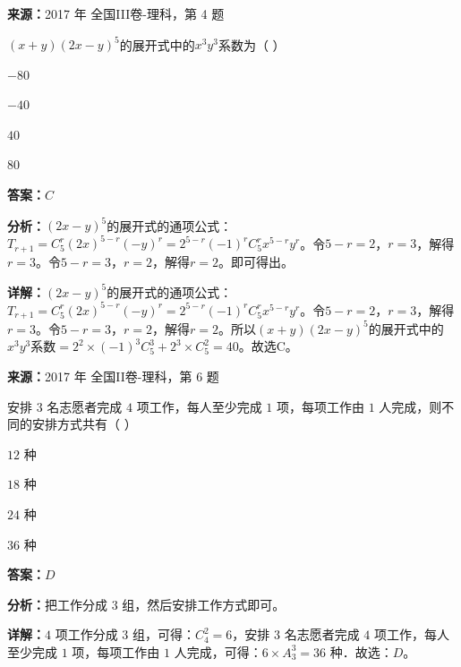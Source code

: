 \begin{question}[points=5]
\textbf{来源：}2017 年 全国III卷-理科，第 4 题\par
$(x+y)(2x-y)^5$的展开式中的$x^3y^3$系数为（ ）
\begin{choices}
  \item $-80$
  \item $-40$
  \item $40$
  \item $80$
\end{choices}
\begin{solution}
\textbf{答案：}$C$

\textbf{分析：}$(2x-y)^5$的展开式的通项公式：$T_{r+1}=C_{5}^{r}(2x)^{5-r}(-y)^r=2^{5-r}(-1)^r C_{5}^{r}x^{5-r}y^r$。令$5-r=2$，$r=3$，解得$r=3$。令$5-r=3$，$r=2$，解得$r=2$。即可得出。

\textbf{详解：}$(2x-y)^5$的展开式的通项公式：$T_{r+1}=C_{5}^{r}(2x)^{5-r}(-y)^r=2^{5-r}(-1)^r C_{5}^{r}x^{5-r}y^r$。令$5-r=2$，$r=3$，解得$r=3$。令$5-r=3$，$r=2$，解得$r=2$。所以$(x+y)(2x-y)^5$的展开式中的$x^3y^3$系数$=2^2\times(-1)^3 C_{5}^{3}+2^3\times C_{5}^{2}=40$。故选C。
\end{solution}
\end{question}

\begin{question}[points=5]
\textbf{来源：}2017 年 全国II卷-理科，第 6 题\par
安排 $3$ 名志愿者完成 $4$ 项工作，每人至少完成 $1$ 项，每项工作由 $1$ 人完成，则不同的安排方式共有（   ）
\begin{choices}
  \item $12$ 种
  \item $18$ 种
  \item $24$ 种
  \item $36$ 种
\end{choices}
\begin{solution}
\textbf{答案：}$D$

\textbf{分析：}把工作分成 $3$ 组，然后安排工作方式即可。

\textbf{详解：}$4$ 项工作分成 $3$ 组，可得：$C_4^2=6$，安排 $3$ 名志愿者完成 $4$ 项工作，每人至少完成 $1$ 项，每项工作由 $1$ 人完成，可得：$6\times A_3^3=36$ 种．故选：$D$。
\end{solution}
\end{question}

